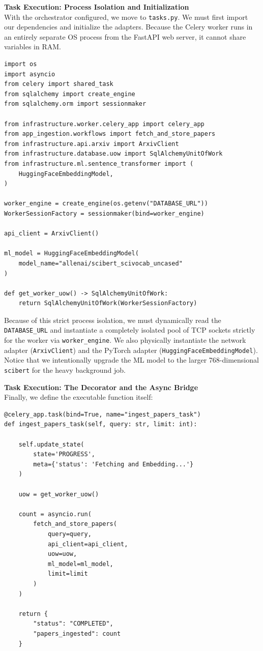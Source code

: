 \textbf{Task Execution: Process Isolation and Initialization} \\
With the orchestrator configured, we move to \texttt{tasks.py}. We must first import our dependencies and initialize the adapters. Because the Celery worker runs in an entirely separate OS process from the FastAPI web server, it cannot share variables in RAM.

\begin{lstlisting}[caption={Worker Imports and Isolated Initialization}]
import os
import asyncio
from celery import shared_task
from sqlalchemy import create_engine
from sqlalchemy.orm import sessionmaker

from infrastructure.worker.celery_app import celery_app
from app_ingestion.workflows import fetch_and_store_papers
from infrastructure.api.arxiv import ArxivClient
from infrastructure.database.uow import SqlAlchemyUnitOfWork
from infrastructure.ml.sentence_transformer import (
    HuggingFaceEmbeddingModel,
)

worker_engine = create_engine(os.getenv("DATABASE_URL"))
WorkerSessionFactory = sessionmaker(bind=worker_engine)

api_client = ArxivClient()

ml_model = HuggingFaceEmbeddingModel(
    model_name="allenai/scibert_scivocab_uncased"
)

def get_worker_uow() -> SqlAlchemyUnitOfWork:
    return SqlAlchemyUnitOfWork(WorkerSessionFactory)
\end{lstlisting}

Because of this strict process isolation, we must dynamically read the \texttt{DATABASE\_URL} and instantiate a completely isolated pool of TCP sockets strictly for the worker via \texttt{worker\_engine}. We also physically instantiate the network adapter (\texttt{ArxivClient}) and the PyTorch adapter (\texttt{HuggingFaceEmbeddingModel}). Notice that we intentionally upgrade the ML model to the larger 768-dimensional \texttt{scibert} for the heavy background job.

\textbf{Task Execution: The Decorator and the Async Bridge} \\
Finally, we define the executable function itself:

\begin{lstlisting}[caption={The Executable Celery Task}]
@celery_app.task(bind=True, name="ingest_papers_task")
def ingest_papers_task(self, query: str, limit: int):

    self.update_state(
        state='PROGRESS',
        meta={'status': 'Fetching and Embedding...'}
    )

    uow = get_worker_uow()

    count = asyncio.run(
        fetch_and_store_papers(
            query=query,
            api_client=api_client,
            uow=uow,
            ml_model=ml_model,
            limit=limit
        )
    )

    return {
        "status": "COMPLETED",
        "papers_ingested": count
    }
\end{lstlisting}

